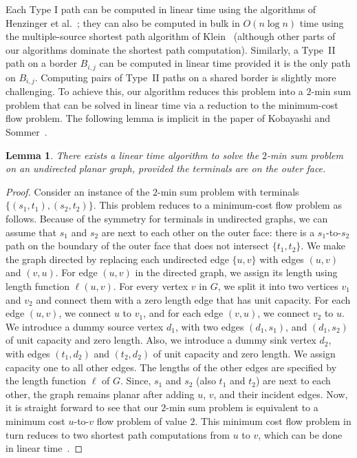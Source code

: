 \documentclass[11pt,twoside]{article}
\newtheorem{lemma}[theorem]{Lemma}
\newcommand{\border}[2]{B_{#1,#2}}
\begin{document}
Each Type I path can be computed in linear time using the algorithms of Henzinger et al.~\cite{henzinger1997planarShortestPaths}; they can also be computed in bulk in $O(n \log n)$ time using the multiple-source shortest path algorithm of Klein~\cite{klein2005multiSourceShPaths} (although other parts of our algorithms dominate the shortest path computation).
Similarly, a Type~II path on a border $\border{i}{j}$ can be computed in linear time provided it is the only path on $\border{i}{j}$.
Computing pairs of Type~II paths on a shared border is slightly more challenging.  
To achieve this, our algorithm reduces this problem into a $2$-min sum problem that can be solved in linear time via a reduction to the minimum-cost flow problem.  
The following lemma is implicit in the paper of Kobayashi and Sommer~\cite{kobayashi2010shortest}. 

\begin{lemma}
\label{lem:2minSum}
There exists a linear time algorithm to solve the $2$-min sum problem on an undirected planar graph, provided the terminals are on the outer face.
\end{lemma}
\begin{proof}
Consider an instance of the $2$-min sum problem with terminals $\{(s_1, t_1), (s_2, t_2)\}$. This problem reduces to a minimum-cost flow problem as follows.
Because of the symmetry for terminals in undirected graphs, we can assume that $s_1$ and $s_2$ are next to each other on the outer face:  there is a $s_1$-to-$s_2$ path on the boundary of the outer face that does not intersect $\{t_1, t_2\}$. We make the graph directed by replacing each undirected edge $\{u,v\}$ with edges $(u, v)$ and $(v, u)$. For edge $(u,v)$ in the directed graph, we assign its length using length function $\ell(u,v)$. For every vertex $v$ in $G$, we split it into two vertices $v_{1}$ and $v_{2}$ and connect them with a zero length edge that has unit capacity. For each edge $(u, v)$, we connect $u$ to $v_{1}$, and for each edge $(v, u)$, we connect $v_{2}$ to $u$. We introduce a dummy source vertex $d_1$, with two edges $(d_1, s_1)$, and $(d_1, s_2)$ of unit capacity and zero length.  Also, we introduce a dummy sink vertex $d_2$, with edges $(t_1, d_2)$ and $(t_2, d_2)$ of unit capacity and zero length.  We assign capacity one to all other edges.  The lengths of the other edges are specified by the length function $\ell$ of $G$. Since, $s_1$ and $s_2$ (also $t_1$ and $t_2$) are next to each other, the graph remains planar after adding $u$, $v$, and their incident edges.
Now, it is straight forward to see that our $2$-min sum problem is equivalent to a minimum cost $u$-to-$v$ flow problem of value $2$.
This minimum cost flow problem in turn reduces to two shortest path computations from $u$ to $v$, which can be done in linear time~\cite{henzinger1997planarShortestPaths}.
\end{proof}
\end{document}
